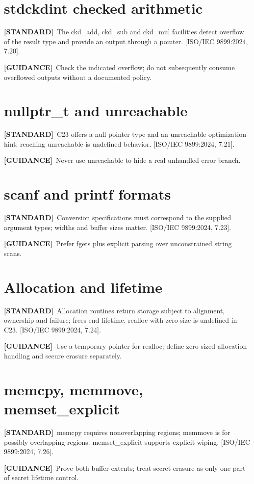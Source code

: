 \documentclass[10pt,letterpaper,oneside]{report}
\newcommand{\refcl}[1]{\textsf{\footnotesize[ISO/IEC 9899:2024, #1]}}
\newcommand{\standard}{\textbf{[STANDARD]}}
\newcommand{\guidance}{\textbf{[GUIDANCE]}}
\begin{document}
\section{stdckdint checked arithmetic}
\standard\ The ckd\_add, ckd\_sub and ckd\_mul facilities detect overflow of the result type and provide an output through a pointer. \refcl{7.20}.\par\guidance\ Check the indicated overflow; do not subsequently consume overflowed outputs without a documented policy.

\section{nullptr\_t and unreachable}
\standard\ C23 offers a null pointer type and an unreachable optimization hint; reaching unreachable is undefined behavior. \refcl{7.21}.\par\guidance\ Never use unreachable to hide a real unhandled error branch.

\section{scanf and printf formats}
\standard\ Conversion specifications must correspond to the supplied argument types; widths and buffer sizes matter. \refcl{7.23}.\par\guidance\ Prefer fgets plus explicit parsing over unconstrained string scans.

\section{Allocation and lifetime}
\standard\ Allocation routines return storage subject to alignment, ownership and failure; frees end lifetime. realloc with zero size is undefined in C23. \refcl{7.24}.\par\guidance\ Use a temporary pointer for realloc; define zero-sized allocation handling and secure erasure separately.

\section{memcpy, memmove, memset\_explicit}
\standard\ memcpy requires nonoverlapping regions; memmove is for possibly overlapping regions. memset\_explicit supports explicit wiping. \refcl{7.26}.\par\guidance\ Prove both buffer extents; treat secret erasure as only one part of secret lifetime control.
\end{document}
